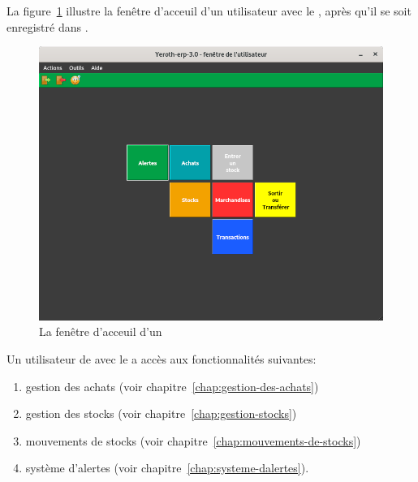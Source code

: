 \label{sec:utilisateurs-gestionairedestocks}

La figure~\ref{fig:yeren-fenetre-gestionairedestocks} illustre
la fen\^etre d'acceuil d'un utilisateur avec le \role \gestionairedestocks, 
apr\`es qu'il se soit enregistr\'e dans \yeren.\\

\begin{figure}[!htbp]
\centering
\includegraphics[scale=0.63]{images/yeren-fenetre-gestionairedestocks.png}
\caption{La fen\^etre d'acceuil d'un \gestionairedestocks}
\label{fig:yeren-fenetre-gestionairedestocks}
\end{figure}

Un utilisateur de \yeren avec le \role \gestionairedestocks a acc\`es
aux fonctionnalit\'es suivantes:

\begin{enumerate}[1)]
	\item gestion des achats (voir chapitre~\ref{chap:gestion-des-achats})
	\item gestion des stocks (voir chapitre~\ref{chap:gestion-stocks})
	\item mouvements de stocks (voir chapitre~\ref{chap:mouvements-de-stocks})	
	\item syst\`eme d'alertes (voir chapitre~\ref{chap:systeme-dalertes}).\\
\end{enumerate}